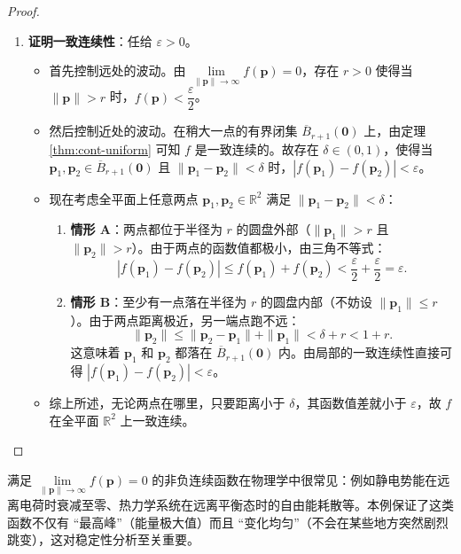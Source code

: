 \documentclass[lang=cn,11pt]{elegantbook}
\begin{document}
\begin{proof}
\begin{enumerate}
  \item \textbf{证明一致连续性}：任给 $\varepsilon>0$。
  \begin{itemize}
    \item 首先控制远处的波动。由 $\lim\limits_{\|\boldsymbol{p}\|\to\infty}f(\boldsymbol{p})=0$，存在 $r>0$ 使得当 $\|\boldsymbol{p}\|>r$ 时，$f(\boldsymbol{p})<\dfrac\varepsilon2$。
    \item 然后控制近处的波动。在稍大一点的有界闭集 $\overline{B}_{r+1}(\boldsymbol{0})$ 上，由定理 \ref{thm:cont-uniform} 可知 $f$ 是一致连续的。故存在 $\delta\in(0,1)$，使得当 $\boldsymbol{p}_1,\boldsymbol{p}_2\in\overline{B}_{r+1}(\boldsymbol{0})$ 且 $\|\boldsymbol{p}_1-\boldsymbol{p}_2\|<\delta$ 时，$|f(\boldsymbol{p}_1)-f(\boldsymbol{p}_2)|<\varepsilon$。
    \item 现在考虑全平面上任意两点 $\boldsymbol{p}_1,\boldsymbol{p}_2 \in \mathbb{R}^2$ 满足 $\|\boldsymbol{p}_1-\boldsymbol{p}_2\|<\delta$：
      \begin{enumerate}
        \item \textbf{情形 A}：两点都位于半径为 $r$ 的圆盘外部（$\|\boldsymbol{p}_1\|>r$ 且 $\|\boldsymbol{p}_2\|>r$）。由于两点的函数值都极小，由三角不等式：
        \[
        |f(\boldsymbol{p}_1)-f(\boldsymbol{p}_2)|\leqslant  f(\boldsymbol{p}_1)+f(\boldsymbol{p}_2)<\frac\varepsilon2+\frac\varepsilon2=\varepsilon.
        \]
        \item \textbf{情形 B}：至少有一点落在半径为 $r$ 的圆盘内部（不妨设 $\|\boldsymbol{p}_1\|\leqslant  r$）。由于两点距离极近，另一端点跑不远：
        \[
        \|\boldsymbol{p}_2\|\leq\|\boldsymbol{p}_2-\boldsymbol{p}_1\|+\|\boldsymbol{p}_1\|<\delta+r < 1+r.
        \]
        这意味着 $\boldsymbol{p}_1$ 和 $\boldsymbol{p}_2$ 都落在 $\overline{B}_{r+1}(\boldsymbol{0})$ 内。由局部的一致连续性直接可得 $|f(\boldsymbol{p}_1)-f(\boldsymbol{p}_2)|<\varepsilon$。
      \end{enumerate}
    \item 综上所述，无论两点在哪里，只要距离小于 $\delta$，其函数值差就小于 $\varepsilon$，故 $f$ 在全平面 $\mathbb{R}^2$ 上一致连续。
  \end{itemize}
\end{enumerate}

\end{proof}

\begin{remark}[本例的物理背景]
满足 $\lim\limits_{\|\boldsymbol{p}\|\to\infty}f(\boldsymbol{p})=0$ 的非负连续函数在物理学中很常见：例如静电势能在远离电荷时衰减至零、热力学系统在远离平衡态时的自由能耗散等。本例保证了这类函数不仅有 ``最高峰''（能量极大值）而且 ``变化均匀''（不会在某些地方突然剧烈跳变），这对稳定性分析至关重要。
\end{remark}
\end{document}
